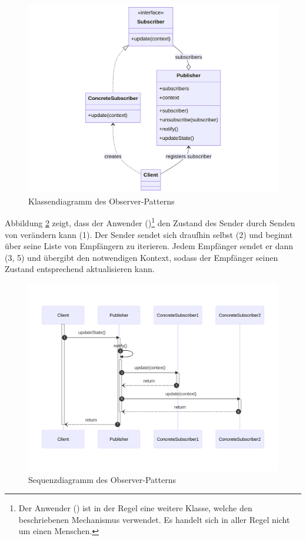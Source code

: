 \begin{figure}[H]
	\centering
	\includegraphics[width=0.95\linewidth]{images/patterns/observer-class.png}
	\caption{Klassendiagramm des Observer-Patterns \cite{skobeleva_observer_2023}}
	\label{fig:observer-class}
\end{figure}

Abbildung \ref{fig:observer-seq} zeigt, dass der Anwender ()\footnote{Der Anwender () ist in der Regel eine weitere Klasse, welche den beschriebenen Mechanismus verwendet. Es handelt sich in aller Regel nicht um einen Menschen.} den Zustand des Sender durch Senden von  verändern kann (1). Der Sender sendet sich draufhin selbst  (2) und beginnt über seine Liste von Empfängern zu iterieren. Jedem Empfänger sendet er dann  (3, 5) und übergibt den notwendigen Kontext, sodass der Empfänger seinen Zustand entsprechend aktualisieren kann.

\begin{figure}[H]
	\centering
	\includegraphics[width=0.95\linewidth]{images/patterns/observer-seq.png}
	\caption{Sequenzdiagramm des Observer-Patterns \cite{skobeleva_observer_2023}}
	\label{fig:observer-seq}
\end{figure}

